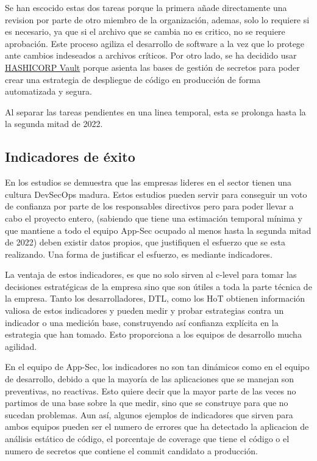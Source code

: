 \documentclass[12pt]{report} %
\begin{document}
Se han escocido estas dos tareas porque la primera añade directamente una
revision por parte de otro miembro de la organización, ademas, solo lo requiere
si es necesario, ya que si el archivo que se cambia no es critico, no se
requiere aprobación. Este proceso agiliza el desarrollo de software a la vez que
lo protege ante cambios indeseados a archivos críticos.
Por otro lado, se ha decidido usar
\href{https://www.hashicorp.com/products/vault}{HASHICORP Vault} 
porque asienta las bases de gestión de secretos para poder crear una estrategia
de despliegue de código en producción de forma automatizada y segura.

Al separar las tareas pendientes en una linea temporal, esta se prolonga hasta la
la segunda mitad de 2022.




\subsection{Indicadores de éxito}

En los estudios se demuestra que las empresas lideres en el sector tienen una cultura
\gls{DevSecOps} madura. %
Estos estudios pueden servir para conseguir un voto de confianza por parte de los
responsables directivos pero para poder llevar a cabo el proyecto entero,
(sabiendo que tiene una estimación temporal mínima y que mantiene a todo el equipo
\gls{App-Sec} ocupado al menos hasta la segunda mitad de 2022) deben existir
datos propios, que justifiquen el esfuerzo que se esta realizando.
Una forma de justificar el esfuerzo, es mediante indicadores.

La ventaja de estos indicadores, es que no solo sirven al \gls{c-level} para
tomar las decisiones estratégicas de la empresa sino que son útiles a toda la
parte técnica de la empresa.
Tanto los desarrolladores, \gls{DTL}, como los \gls{HoT} obtienen
información valiosa de estos indicadores y pueden medir y probar estrategias
contra un indicador o una medición base, construyendo así confianza explícita en
la estrategia que han tomado.
Esto proporciona a los equipos de desarrollo mucha agilidad.

En el equipo de \gls{App-Sec}, los indicadores no son tan dinámicos como en el
equipo de desarrollo, debido a que la mayoría de las aplicaciones que se manejan
son preventivas, no reactivas.
Esto quiere decir que la mayor parte de las veces no partimos de una base sobre
la que medir, sino que se construye para que no sucedan problemas.
Aun así, algunos ejemplos de indicadores que sirven para ambos equipos pueden
ser el numero de errores que ha detectado la aplicacion de análisis estático de
código, el porcentaje de \gls{coverage} que tiene el código o el numero de
secretos que contiene el \gls{commit} candidato a producción.
\end{document}
